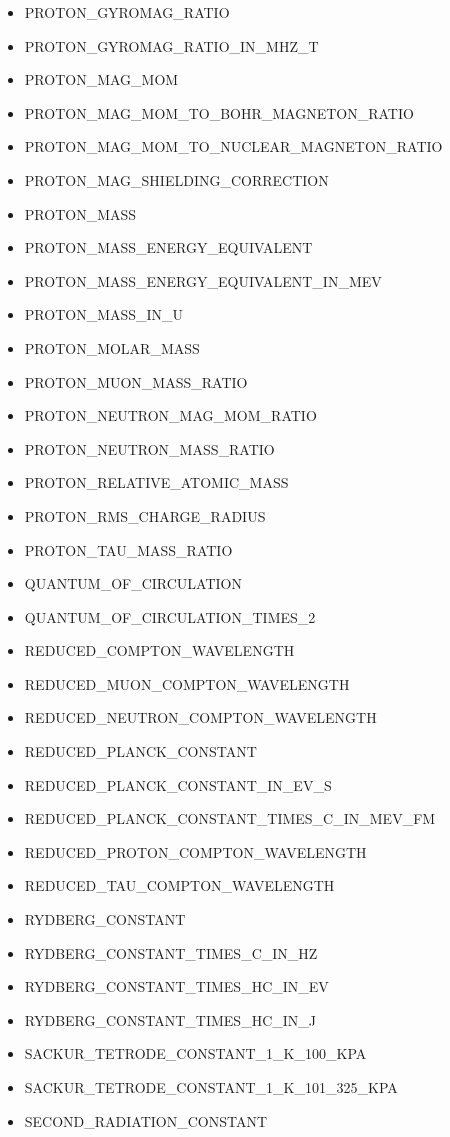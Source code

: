 \begin{itemize}
\item PROTON\_GYROMAG\_RATIO
\item PROTON\_GYROMAG\_RATIO\_IN\_MHZ\_T
\item PROTON\_MAG\_MOM
\item PROTON\_MAG\_MOM\_TO\_BOHR\_MAGNETON\_RATIO
\item PROTON\_MAG\_MOM\_TO\_NUCLEAR\_MAGNETON\_RATIO
\item PROTON\_MAG\_SHIELDING\_CORRECTION
\item PROTON\_MASS
\item PROTON\_MASS\_ENERGY\_EQUIVALENT
\item PROTON\_MASS\_ENERGY\_EQUIVALENT\_IN\_MEV
\item PROTON\_MASS\_IN\_U
\item PROTON\_MOLAR\_MASS
\item PROTON\_MUON\_MASS\_RATIO
\item PROTON\_NEUTRON\_MAG\_MOM\_RATIO
\item PROTON\_NEUTRON\_MASS\_RATIO
\item PROTON\_RELATIVE\_ATOMIC\_MASS
\item PROTON\_RMS\_CHARGE\_RADIUS
\item PROTON\_TAU\_MASS\_RATIO
\item QUANTUM\_OF\_CIRCULATION
\item QUANTUM\_OF\_CIRCULATION\_TIMES\_2
\item REDUCED\_COMPTON\_WAVELENGTH
\item REDUCED\_MUON\_COMPTON\_WAVELENGTH
\item REDUCED\_NEUTRON\_COMPTON\_WAVELENGTH
\item REDUCED\_PLANCK\_CONSTANT
\item REDUCED\_PLANCK\_CONSTANT\_IN\_EV\_S
\item REDUCED\_PLANCK\_CONSTANT\_TIMES\_C\_IN\_MEV\_FM
\item REDUCED\_PROTON\_COMPTON\_WAVELENGTH
\item REDUCED\_TAU\_COMPTON\_WAVELENGTH
\item RYDBERG\_CONSTANT
\item RYDBERG\_CONSTANT\_TIMES\_C\_IN\_HZ
\item RYDBERG\_CONSTANT\_TIMES\_HC\_IN\_EV
\item RYDBERG\_CONSTANT\_TIMES\_HC\_IN\_J
\item SACKUR\_TETRODE\_CONSTANT\_1\_K\_100\_KPA
\item SACKUR\_TETRODE\_CONSTANT\_1\_K\_101\_325\_KPA
\item SECOND\_RADIATION\_CONSTANT

\end{itemize}

